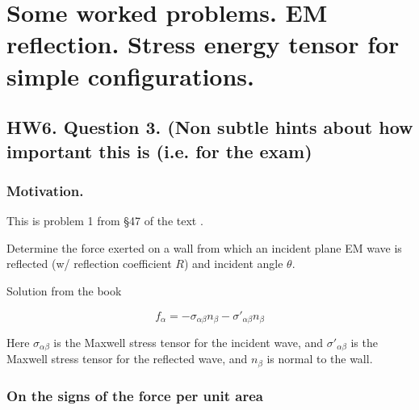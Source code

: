%
%

\chapter{Some worked problems.  EM reflection.  Stress energy tensor for simple configurations.}
\label{chap:relativisticElectrodynamicsT9}
{}
\date{Mar 30, 2011}

\beginArtWithToc

\section{HW6. Question 3. (Non subtle hints about how important this is (i.e. for the exam)}

\subsection{Motivation.}

This is problem 1 from \S 47 of the text \citep{landau1980classical}.

Determine the force exerted on a wall from which an incident plane EM wave is reflected (w/ reflection coefficient $R$) and incident angle $\theta$.

Solution from the book

\begin{equation}\label{eqn:relativisticElectrodynamicsT9:10}
f_\alpha = - \sigma_{\alpha \beta} n_\beta - {\sigma'}_{\alpha \beta} n_\beta
\end{equation}

Here $\sigma_{\alpha \beta}$ is the Maxwell stress tensor for the incident wave, and ${\sigma'}_{\alpha \beta}$ is the Maxwell stress tensor for the reflected wave, and $n_\beta$ is normal to the wall.

\subsection{On the signs of the force per unit area}

